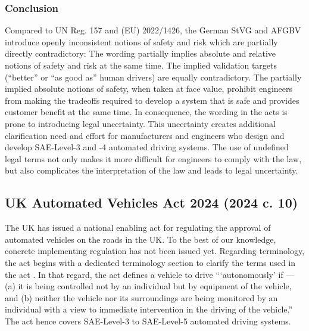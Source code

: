 \subsubsection{Conclusion}
Compared to UN Reg. 157 and (EU) 2022/1426, the German StVG and AFGBV introduce openly inconsistent notions of safety and risk which are partially directly contradictory:
The wording partially implies absolute and relative notions of safety and risk at the same time.
The implied validation targets (``better'' or ``as good as'' human drivers) are equally contradictory. 
The partially implied absolute notions of safety, when taken at face value, prohibit engineers from making the tradeoffs required to develop a system that is safe and provides customer benefit at the same time. 
In consequence, the wording in the acts is prone to introducing legal uncertainty.
This uncertainty creates additional clarification need and effort for manufacturers and engineers who design and develop SAE-Level-3 and -4 automated driving systems. The use of undefined legal terms not only makes it more difficult for engineers to comply with the law, but also complicates the interpretation of the law and leads to legal uncertainty.

\subsection{UK Automated Vehicles Act 2024 (2024 c. 10)}
The UK has issued a national enabling act for regulating the approval of automated vehicles on the roads in the UK.
To the best of our knowledge, concrete implementing regulation has not been issued yet.
Regarding terminology, the act begins with a dedicated terminology section to clarify the terms used in the act \parencite[Part 1, Chapter 1, Section 1]{ukav2024}.
In that regard, the act defines a vehicle to drive ```autonomously' if --- (a)
it is being controlled not by an individual but by equipment of the vehicle, and (b) neither the vehicle nor its surroundings are being monitored by an individual with a view to immediate intervention in the driving of the vehicle.''
The act hence covers SAE-Level-3 to SAE-Level-5 automated driving systems.

